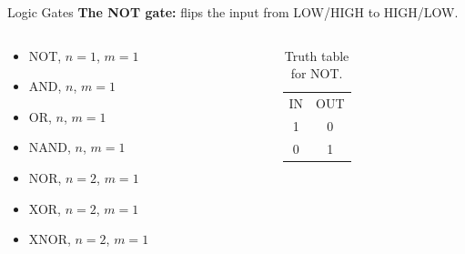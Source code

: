 \documentclass{beamer}
\begin{document}
\begin{frame}{Logic Gates}
\textbf{The NOT gate:} flips the input from LOW/HIGH to HIGH/LOW. \\ \vspace{0.5cm}
\begin{columns}[T]
\begin{column}{0.5\textwidth}
\begin{itemize}
\item \alert{NOT, $n=1$, $m=1$}
\item AND, $n$, $m=1$
\item OR, $n$, $m=1$
\item NAND, $n$, $m=1$
\item NOR, $n=2$, $m=1$
\item XOR, $n=2$, $m=1$
\item XNOR, $n=2$, $m=1$
\end{itemize}
\end{column}
\begin{column}{0.5\textwidth}
\begin{table}
\begin{tabular}{c c}
IN & OUT \\
1 & 0 \\
0 & 1
\end{tabular}
\caption{\label{tab:NOT} Truth table for NOT.}
\end{table}
\end{column}
\end{columns}
\end{frame}
\end{document}
